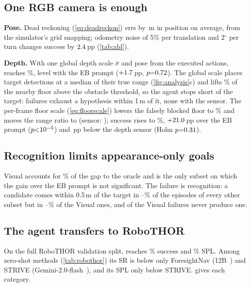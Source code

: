 \subsection{One RGB camera is enough}
\label{sec:sensing}
\noindent\textbf{Pose.}
Dead reckoning (\cref{eq:deadreckon}) errs by \nDRmean\,m in position on average, from the simulator's grid
snapping; odometry noise of 5\% per translation and 2$^\circ$ per turn changes success by $2.4$\,pp
(\cref{tab:abl}).

\noindent\textbf{Depth.}
With one global depth scale $\bar\sigma$ and pose from the executed actions, \ours reaches \nRGBGlobal\%, level with the EB prompt ($+1.7$\,pp,
$p{=}0.72$). The global scale places target detections at a median \nRangeGlobal{} of their true range
(\cref{fig:analysis}c) and lifts \nBlockGlobal\% of the nearby floor above the obstacle threshold, so the agent
stops short of the target: \nShortGlobal{} failures exhaust a hypothesis within 1\,m of it, none with
the sensor. The per-frame floor scale (\cref{eq:floorscale}) lowers the falsely blocked floor to \nBlockFloor\% and
moves the range ratio to \nRangeFloor{} (sensor: \nRangeSensor); success rises to \nRGBThree\%, ${+}21.0$\,pp
over the EB prompt ($p{<}10^{-5}$) and \nGapRGBAbs\,pp below the depth sensor (Holm $p{=}0.31$).


\subsection{Recognition limits appearance-only goals}
\label{sec:gap}
Visual accounts for \nVisGapShare\% of the gap to the oracle and is the only subset on which the gain over the
EB prompt is not significant. The failure is recognition: a candidate comes within 0.5\,m of the target in
\nRecallOtherLo--\nRecallOtherHi\% of the episodes of every other subset but in \nRecallVisLo--\nRecallVisHi\% of the
Visual ones, and \nVisFailNoCand{} of the \nVisFail{} Visual failures never produce one.

\subsection{The agent transfers to RoboTHOR}
\label{sec:robothor}
On the full RoboTHOR validation split, \ours reaches \nRoboSR\% success and \nRoboSPL\% SPL. Among zero-shot
methods (\cref{tab:robothor}) its SR is below only ForesightNav (12B~\cite{liu2026foresightnav}) and STRIVE
(Gemini-2.0-flash~\cite{zhu2025strive}), and its SPL only below STRIVE.  gives each category.
